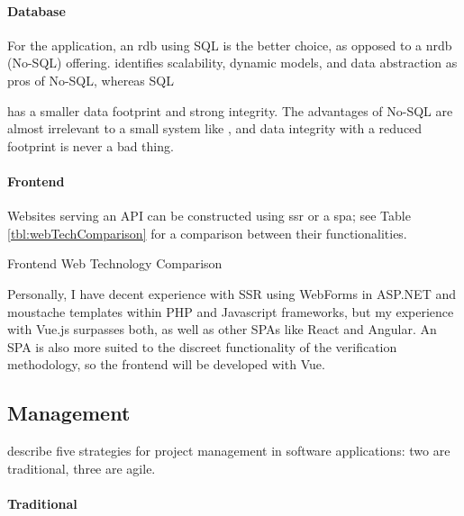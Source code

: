 \paragraph{Database}
For the \projectname{} application, an \gls{rdb} using SQL
is the better choice, as opposed to a \gls{nrdb} (No-SQL)
offering.
\cite{databaseComparison} identifies scalability, dynamic
models, and data abstraction as pros of No-SQL, whereas SQL

has a smaller data footprint and strong integrity.
The advantages of No-SQL are almost irrelevant to a small
system like \projectname{}, and data integrity with a
reduced footprint is never a bad thing.


\paragraph{Frontend}
Websites serving an API can be constructed using \gls{ssr}
or a \gls{spa}; see Table \ref{tbl:webTechComparison} for a
comparison between their functionalities.

\begin{table}[h]
  \centering
  \small
  
  \caption{Frontend Web Technology Comparison}
  \label{tbl:webTechComparison}
\end{table}

Personally, I have decent experience with SSR using
WebForms in ASP.NET and moustache templates within PHP and
Javascript frameworks, but my experience with Vue.js
surpasses both, as well as other SPAs like React and
Angular.
An SPA is also more suited to the discreet functionality of
the verification methodology, so the frontend will be
developed with Vue.



\subsection{Management}

\cite{agileVsTraditional} describe five strategies for
project management in software applications: two are
traditional, three are agile.

\paragraph{Traditional}

